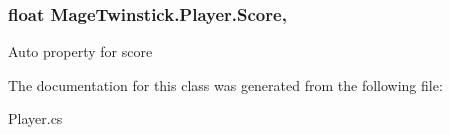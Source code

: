 \hypertarget{class_mage_twinstick_1_1_player_aa4b4878249b47797666fb77c82184533}{}
\subsubsection[{Score}]{\setlength{\rightskip}{0pt plus 5cm}float Mage\+Twinstick.\+Player.\+Score\hspace{0.3cm}{\ttfamily [get]}, {\ttfamily [set]}}\label{class_mage_twinstick_1_1_player_aa4b4878249b47797666fb77c82184533}


Auto property for score 



The documentation for this class was generated from the following file\+:\begin{DoxyCompactItemize}
\item 
Player.\+cs\end{DoxyCompactItemize}
